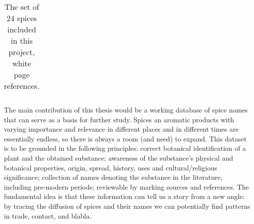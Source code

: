 \begin{table}[ht]
\begin{tabularx}{\textwidth}{@{}r>{\footnotesize}llll@{}rl@{}}
\bottomrule
\end{tabularx}
\caption[The set of 24 spices included in this project.]{The set of 24 spices included in this project, white page references.}
\end{table}

\setlength{\tabcolsep}{6pt}





The main contribution of this thesis would be a working database of spice names that can serve as a basis for further study. Spices an aromatic products with varying importance and relevance in different places and in different times are essentially endless, so there is always a room (and need) to expand. This dataset is to be grounded in the following principles: correct botanical identification of a plant and the obtained substance; awareness of the substance's physical and botanical properties, origin, spread, history, uses and cultural/religious significance; collection of names denoting the substance in the literature, including pre-modern periods; reviewable by marking sources and references. The fundamental idea is that these information can tell us a story from a new angle: by tracing the diffusion of spices and their names we can potentially find patterns in trade, contact, and blabla. 

